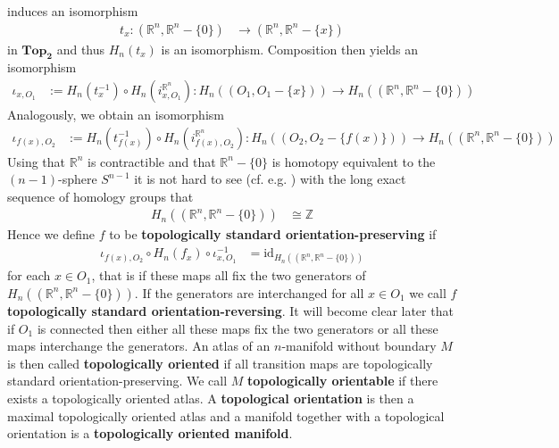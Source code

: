 induces an isomorphism
\begin{align*}
  t_{x}
  \colon
  (\mathbb{R}^{n},\mathbb{R}^{n} - \lbrace 0 \rbrace)
  &\to
  (\mathbb{R}^{n},\mathbb{R}^{n} - \lbrace x \rbrace)
\end{align*}
in $\mathbf{Top_{2}}$ and thus $H_{n}(t_{x})$ is an isomorphism. Composition then yields an isomorphism
\begin{align*}
  \iota_{x,O_{1}}
  &:=
  H_{n}(t_{x}^{-1})
  \circ
  H_{n}(i_{x,O_{1}}^{\mathbb{R}^{n}})
  \colon
  H_{n}
  \left(
    (O_{1},O_{1} - \lbrace x \rbrace)
  \right)
  \to
  H_{n}
  \left(
    (\mathbb{R}^{n},\mathbb{R}^{n} - \lbrace 0 \rbrace)
  \right)
\end{align*}
Analogously, we obtain an isomorphism
\begin{align*}
  \iota_{f(x),O_{2}}
  &:=
  H_{n}(t_{f(x)}^{-1})
  \circ
  H_{n}(i_{f(x),O_{2}}^{\mathbb{R}^{n}})
  \colon
  H_{n}
  \left(
    (O_{2},O_{2} - \lbrace f(x) \rbrace)
  \right)
  \to
  H_{n}
  \left(
    (\mathbb{R}^{n},\mathbb{R}^{n} - \lbrace 0 \rbrace)
  \right)
\end{align*}
Using that $\mathbb{R}^{n}$ is contractible and that $\mathbb{R}^{n} - \lbrace 0 \rbrace$ is homotopy equivalent to the $(n-1)$-sphere $S^{n-1}$ it is not hard to see (cf. e.g. \cite{8b5861fc}) with the long exact sequence of homology groups that
\begin{align*}
  H_{n}((\mathbb{R}^{n},\mathbb{R}^{n} - \lbrace 0 \rbrace))
  &\cong
  \mathbb{Z}
\end{align*}
Hence we define $f$ to be \textbf{topologically standard orientation-preserving} if
\begin{align*}
  \iota_{f(x),O_{2}}
  \circ
  H_{n}(f_{x})
  \circ
  \iota_{x,O_{1}}^{-1}
  &=
  \mathrm{id}_{H_{n}((\mathbb{R}^{n},\mathbb{R}^{n} - \lbrace 0 \rbrace))}
\end{align*}
for each $x \in O_{1}$, that is if these maps all fix the two generators of $H_{n}((\mathbb{R}^{n},\mathbb{R}^{n} - \lbrace 0 \rbrace))$. If the generators are interchanged for all $x \in O_{1}$ we call $f$ \textbf{topologically standard orientation-reversing}. It will become clear later that if $O_{1}$ is connected then either all these maps fix the two generators or all these maps interchange the generators. An atlas of an $n$-manifold without boundary $M$ is then called \textbf{topologically oriented} if all transition maps are topologically standard orientation-preserving. We call $M$ \textbf{topologically orientable} if there exists a topologically oriented atlas. A \textbf{topological orientation} is then a maximal topologically oriented atlas and a manifold together with a topological orientation is a \textbf{topologically oriented manifold}.
